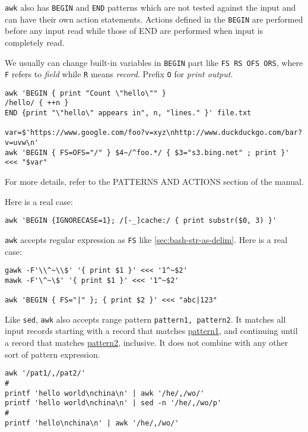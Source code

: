\lstinline|awk| also has \verb|BEGIN| and \verb|END| patterns
which are not tested against the input and can have their own
action statements. Actions defined in the \verb|BEGIN| are
performed before any input read while those of END are performed
when input is completely read.

We usually can change built-in variables in \verb|BEGIN| part like
\verb|FS RS OFS ORS|, where \verb|F| refers to \textit{field}
while \verb|R| means \textit{record}. Prefix \verb|O| for
\textit{print output}.

\begin{lstlisting}
awk 'BEGIN { print "Count \"hello\"" }
/hello/ { ++n }
END {print "\"hello\" appears in", n, "lines." }' file.txt

var=$'https://www.google.com/foo?v=xyz\nhttp://www.duckduckgo.com/bar?v=uvw\n'
awk 'BEGIN { FS=OFS="/" } $4~/^foo.*/ { $3="s3.bing.net" ; print }' <<< "$var"
\end{lstlisting}

For more details, refer to the PATTERNS AND ACTIONS section of the
manual.

Here is a real case:

\begin{lstlisting}
awk 'BEGIN {IGNORECASE=1}; /[-_]cache:/ { print substr($0, 3) }'
\end{lstlisting}

\lstinline|awk| accepts regular expression as \verb|FS| like
\ref{sec:bash-str-as-delim}. Here is a real case:

\begin{lstlisting}
gawk -F'\\^~\\$' '{ print $1 }' <<< '1^~$2'
mawk -F'\^~\$' '{ print $1 }' <<< '1^~$2'

awk 'BEGIN { FS="|" }; { print $2 }' <<< "abc|123"
\end{lstlisting}

Like \lstinline|sed|, \lstinline|awk| also accepts range pattern
\verb|pattern1, pattern2|. It matches all input records starting
with a record that matches \uline{pattern1}, and continuing until
a record that matches \uline{pattern2}, inclusive. It does not
combine with any other sort of pattern expression.

\begin{lstlisting}
awk '/pat1/,/pat2/'
#
printf 'hello world\nchina\n' | awk '/he/,/wo/'
printf 'hello world\nchina\n' | sed -n '/he/,/wo/p'
#
printf 'hello\nchina\n' | awk '/he/,/wo/'
\end{lstlisting}

